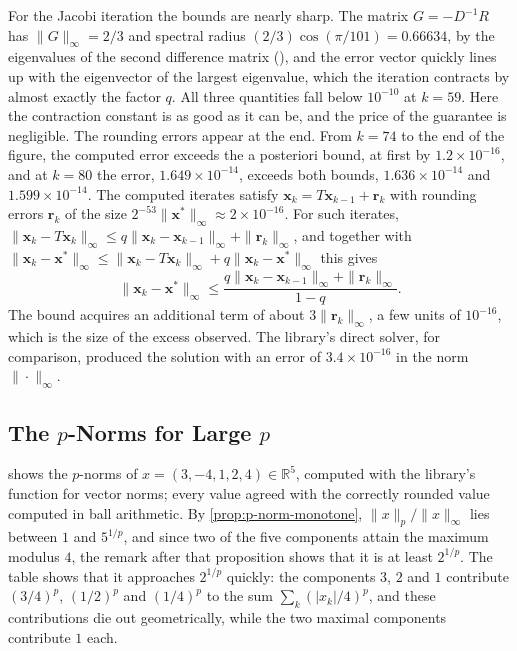 For the Jacobi iteration the bounds are nearly sharp. The matrix $G=-D^{-1}R$ has $\|G\|_\infty=2/3$ and spectral radius $(2/3)\cos(\pi/101)=0.66634$, by the eigenvalues of the second difference matrix (), and the error vector quickly lines up with the eigenvector of the largest eigenvalue, which the iteration contracts by almost exactly the factor $q$. All three quantities fall below $10^{-10}$ at $k=59$. Here the contraction constant is as good as it can be, and the price of the guarantee is negligible. The rounding errors appear at the end. From $k=74$ to the end of the figure, the computed error exceeds the a posteriori bound, at first by $1.2\times10^{-16}$, and at $k=80$ the error, $1.649\times10^{-14}$, exceeds both bounds, $1.636\times10^{-14}$ and $1.599\times10^{-14}$. The computed iterates satisfy $\mathbf x_k=T\mathbf x_{k-1}+\mathbf r_k$ with rounding errors $\mathbf r_k$ of the size $2^{-53}\|\mathbf x^*\|_\infty\approx2\times10^{-16}$. For such iterates, $\|\mathbf x_k-T\mathbf x_k\|_\infty\le q\|\mathbf x_k-\mathbf x_{k-1}\|_\infty+\|\mathbf r_k\|_\infty$, and together with $\|\mathbf x_k-\mathbf x^*\|_\infty\le\|\mathbf x_k-T\mathbf x_k\|_\infty+q\|\mathbf x_k-\mathbf x^*\|_\infty$ this gives
\[
\|\mathbf x_k-\mathbf x^*\|_\infty\le\frac{q\|\mathbf x_k-\mathbf x_{k-1}\|_\infty+\|\mathbf r_k\|_\infty}{1-q} .
\]
The bound acquires an additional term of about $3\|\mathbf r_k\|_\infty$, a few units of $10^{-16}$, which is the size of the excess observed. The library's direct solver, for comparison, produced the solution with an error of $3.4\times10^{-16}$ in the norm $\|\cdot\|_\infty$.

\subsection{The \texorpdfstring{$p$}{p}-Norms for Large \texorpdfstring{$p$}{p}}

 shows the $p$-norms of $x=(3,-4,1,2,4)\in\mathbb R^5$, computed with the library's function for vector norms; every value agreed with the correctly rounded value computed in ball arithmetic. By \cref{prop:p-norm-monotone}, $\|x\|_p/\|x\|_\infty$ lies between $1$ and $5^{1/p}$, and since two of the five components attain the maximum modulus $4$, the remark after that proposition shows that it is at least $2^{1/p}$. The table shows that it approaches $2^{1/p}$ quickly: the components $3$, $2$ and $1$ contribute $(3/4)^p$, $(1/2)^p$ and $(1/4)^p$ to the sum $\sum_k(|x_k|/4)^p$, and these contributions die out geometrically, while the two maximal components contribute $1$ each.

